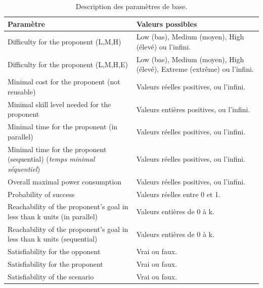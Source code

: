 	\begin{table}[h]
		\centering
		\begin{tabular}{|p{6cm}|p{5cm}|}
			\hline
			\textbf{Paramètre} & \textbf{Valeurs possibles} \\
			\hline
			Difficulty for the proponent (L,M,H) & 
				Low (bas), Medium (moyen), High (élevé) ou l'infini.\\ 
			\hline
			Difficulty for the proponent (L,M,H,E) & 
				Low (bas), Medium (moyen), High (élevé), Extreme (extrême) ou l'infini.\\ 
			\hline
			Minimal cost for the proponent (not reusable) & 
				Valeurs réelles positives, ou l'infini.\\ 
			\hline
			Minimal skill level needed for the proponent & 
				Valeurs entières positives, ou l'infini.\\ 
			\hline
			Minimal time for the proponent (in parallel) & 
				Valeurs réelles positives, ou l'infini.\\ 
			\hline
			Minimal time for the proponent (sequential) (\textit{temps minimal séquentiel}) & 
				Valeurs réelles positives, ou l'infini.\\ 
			\hline
			Overall maximal power consumption & 
				Valeurs réelles positives, ou l'infini.\\ 
			\hline
			Probability of success &
				Valeurs réelles entre 0 et 1.\\ 
			\hline
			Reachability of the proponent's goal in less than k units (in parallel) & 
				Valeurs entières de 0 à k. \\ 
			\hline
			Reachability of the proponent's goal in less than k units (sequential) & 
				Valeurs entières de 0 à k. \\ 
			\hline
			Satisfiability for the opponent & 
				Vrai ou faux. \\ 
			\hline
			Satisfiability for the proponent & 
				Vrai ou faux. \\ 
			\hline
			Satisfiability of the scenario & 
				Vrai ou faux. \\
			\hline
		\end{tabular}
		\caption{Description des paramètres de base.}
		\label{tab:DescriptionParam}
	\end{table}

